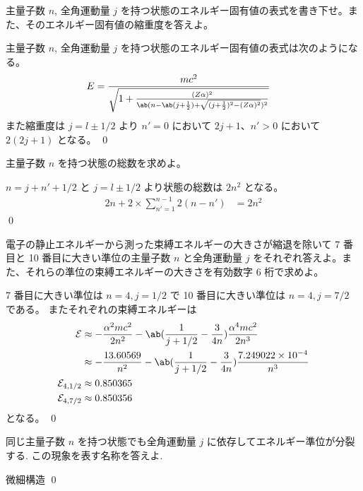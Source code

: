 \documentclass[uplatex,dvipdfmx,a4paper,11pt]{jlreq}
\makeatletter
\theoremstyle{definition}
\renewenvironment{proof}[1][\proofname]{\par
  \normalfont
  \topsep6\p@\@plus6\p@ \trivlist
  \item[\hskip\labelsep{\bfseries #1}\@addpunct{\bfseries}]\ignorespaces\quad\par
}{%
  \qed\endtrivlist\@endpefalse
}
\renewcommand\proofname{証明}
\numberwithin{equation}{section}
\makeatother
\begin{document}
\begin{problem}
主量子数 $n$, 全角運動量 $j$ を持つ状態のエネルギー固有値の表式を書き下せ。また、そのエネルギー固有値の縮重度を答えよ。
\end{problem}
\begin{proof}
  主量子数 $n$, 全角運動量 $j$ を持つ状態のエネルギー固有値の表式は次のようになる。
  \begin{align}
    E & = \frac{mc^2}{\sqrt{1 + \frac{(Z\alpha)^2}{\ab(n - \ab(j + \frac{1}{2}) + \sqrt{(j + \frac{1}{2})^2 - (Z\alpha)^2})^2}}}
  \end{align}
  また縮重度は $j = l \pm 1/2$ より $n' = 0$ において $2j + 1$、$n' > 0$ において $2(2j + 1)$ となる。
\end{proof}

\begin{problem}
主量子数 $n$ を持つ状態の総数を求めよ。
\end{problem}
\begin{proof}
  $n = j + n' + 1/2$ と $j = l \pm 1/2$ より状態の総数は $2n^2$ となる。
  \begin{align}
    2n + 2\times\sum_{n'=1}^{n-1}2(n-n') & = 2n^2
  \end{align}
\end{proof}


\begin{problem}
電子の静止エネルギーから測った束縛エネルギーの大きさが縮退を除いて 7 番目と 10 番目に大きい準位の主量子数 $n$ と全角運動量 $j$ をそれぞれ答えよ。また、それらの準位の束縛エネルギーの大きさを有効数字 6 桁で求めよ。
\end{problem}
\begin{proof}
  7 番目に大きい準位は $n = 4, j = 1/2$ で 10 番目に大きい準位は $n = 4, j = 7/2$ である。
  またそれぞれの束縛エネルギーは
  \begin{align}
    \mathcal{E}         & \approx -\frac{\alpha^2 mc^2}{2n^2} - \ab(\frac{1}{j + 1/2} - \frac{3}{4n})\frac{\alpha^4mc^2}{2n^3}   \\
                        & \approx -\frac{13.60569}{n^2} - \ab(\frac{1}{j + 1/2} - \frac{3}{4n})\frac{7.249022\times10^{-4}}{n^3} \\
    \mathcal{E}_{4,1/2} & \approx 0.850365                                                                                       \\
    \mathcal{E}_{4,7/2} & \approx 0.850356
  \end{align}
  となる。
\end{proof}

\begin{problem}
同じ主量子数 $n$ を持つ状態でも全角運動量 $j$ に依存してエネルギー準位が分裂する. この現象を表す名称を答えよ.
\end{problem}
\begin{proof}
  微細構造
\end{proof}
\end{document}
